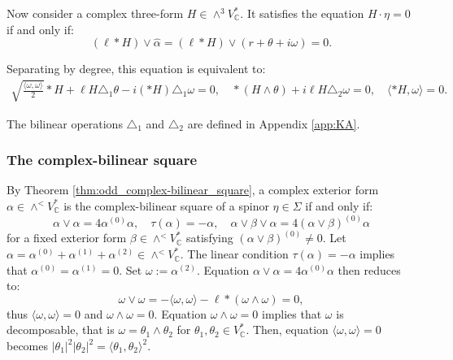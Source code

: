 \documentclass[10pt,a4paper,twoside,reqno]{amsart}
\theoremstyle{plain}
\theoremstyle{definition}
\theoremstyle{remark}
\def\C{\mathbb{C}}
\newcommand{\abs}[1]{\left\lvert#1\right\rvert}
\newcommand{\escal}[1]{\langle#1\rangle}
\begin{document}
Now consider a complex three-form $H\in\wedge^3V_\C^*$. It satisfies the equation $H\cdot\eta=0$ if and only if:
\begin{equation*}
(\ell*H)\vee\widehat{\alpha}=(\ell*H)\vee(r+\theta+i\omega)=0.
\end{equation*}

\noindent
Separating by degree, this equation is equivalent to: 
\begin{eqnarray*}
\sqrt{\frac{\escal{\omega,\omega}}{2}} \ast H + \ell H\triangle_1\theta-i(*H)\triangle_1\omega=0,\quad *(H\wedge\theta)+i\ell H\triangle_2\omega=0,\quad \escal{*H,\omega}=0.    
\end{eqnarray*}

\noindent
The bilinear operations $\triangle_1$ and $\triangle_2$ are defined in Appendix \ref{app:KA}.


\subsubsection{The complex-bilinear square}


By Theorem \ref{thm:odd_complex-bilinear_square}, a complex exterior form $\alpha\in\wedge^< V^*_\C$ is the complex-bilinear square of a spinor $\eta\in\Sigma$ if and only if:
$$\alpha\vee\alpha=4\alpha^{(0)}\alpha,\quad\tau(\alpha)=-\alpha,\quad\alpha\vee\beta\vee\alpha=4(\alpha\vee\beta)^{(0)}\alpha$$ for a fixed exterior form $\beta\in\wedge^<V^*_\C$ satisfying $(\alpha\vee\beta)^{(0)}\neq0$. Let $\alpha=\alpha^{(0)}+\alpha^{(1)}+\alpha^{(2)}\in\wedge^<V^*_\C$. The linear condition $\tau(\alpha)=-\alpha$ implies that $\alpha^{(0)}=\alpha^{(1)}=0$. Set $\omega:=\alpha^{(2)}$. Equation $\alpha\vee\alpha=4\alpha^{(0)}\alpha$ then reduces to:
$$\omega\vee\omega=-\escal{\omega,\omega}-\ell*(\omega\wedge\omega)=0,$$ thus $\escal{\omega,\omega}=0$ and $\omega\wedge\omega=0$. Equation $\omega\wedge\omega=0$ implies that $\omega$ is decomposable, that is $\omega=\theta_1\wedge\theta_2$ for $\theta_1,\theta_2\in V^*_\C$. Then, equation $\escal{\omega,\omega}=0$ becomes $\abs{\theta_1}^2\abs{\theta_2}^2=\escal{\theta_1,\theta_2}^2$.\medskip
\end{document}
